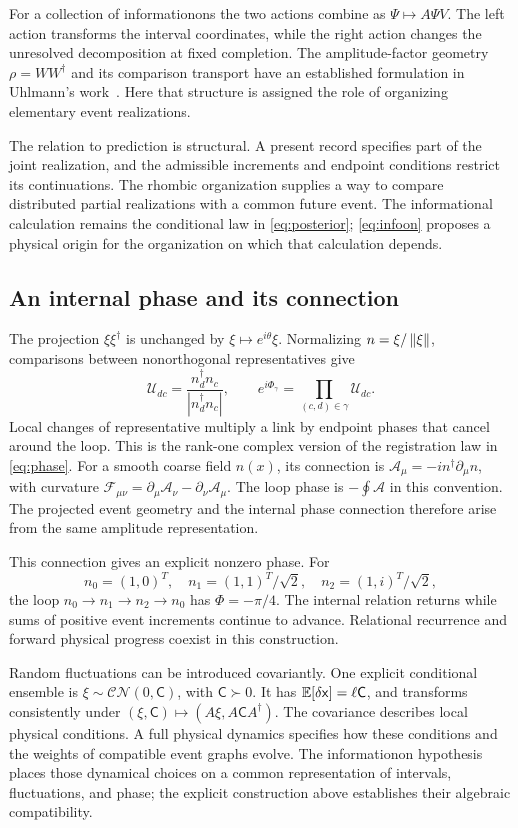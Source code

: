 For a collection of informationons the two actions combine as \(\Psi\mapsto A\Psi V\). The left action transforms the interval coordinates, while the right action changes the unresolved decomposition at fixed completion. The amplitude-factor geometry \(\rho=WW^\dagger\) and its comparison transport have an established formulation in Uhlmann's work~\citep{uhlmann1986}. Here that structure is assigned the role of organizing elementary event realizations.

The relation to prediction is structural. A present record specifies part of the joint realization, and the admissible increments and endpoint conditions restrict its continuations. The rhombic organization supplies a way to compare distributed partial realizations with a common future event. The informational calculation remains the conditional law in \cref{eq:posterior}; \cref{eq:infoon} proposes a physical origin for the organization on which that calculation depends.

\subsection{An internal phase and its connection}
The projection \(\xi\xi^\dagger\) is unchanged by \(\xi\mapsto e^{i\theta}\xi\). Normalizing \(n=\xi/\left\lVert\xi\right\rVert\), comparisons between nonorthogonal representatives give
\begin{equation}
\mathcal U_{dc}=\frac{n_d^\dagger n_c}{|n_d^\dagger n_c|},
\qquad
e^{i\Phi_\gamma}=\prod_{(c,d)\in\gamma}\mathcal U_{dc}.
\label{eq:spinphase}
\end{equation}
Local changes of representative multiply a link by endpoint phases that cancel around the loop. This is the rank-one complex version of the registration law in \cref{eq:phase}. For a smooth coarse field \(n(x)\), its connection is \(\mathcal A_\mu=-i n^\dagger\partial_\mu n\), with curvature \(\mathcal F_{\mu\nu}=\partial_\mu\mathcal A_\nu-\partial_\nu\mathcal A_\mu\). The loop phase is \(-\oint\mathcal A\) in this convention. The projected event geometry and the internal phase connection therefore arise from the same amplitude representation.

This connection gives an explicit nonzero phase. For
\begin{equation*}
n_0=(1,0)^T,\quad
n_1=(1,1)^T/\sqrt2,\quad
n_2=(1,i)^T/\sqrt2,
\end{equation*}
the loop \(n_0\to n_1\to n_2\to n_0\) has \(\Phi=-\pi/4\). The internal relation returns while sums of positive event increments continue to advance. Relational recurrence and forward physical progress coexist in this construction.

Random fluctuations can be introduced covariantly. One explicit conditional ensemble is \(\xi\sim\mathcal{CN}(0,\mathsf C)\), with \(\mathsf C\succ0\). It has \(\mathbb E[\delta\mathsf x]=\ell\mathsf C\), and transforms consistently under \((\xi,\mathsf C)\mapsto(A\xi,A\mathsf CA^\dagger)\). The covariance describes local physical conditions. A full physical dynamics specifies how these conditions and the weights of compatible event graphs evolve. The informationon hypothesis places those dynamical choices on a common representation of intervals, fluctuations, and phase; the explicit construction above establishes their algebraic compatibility.
